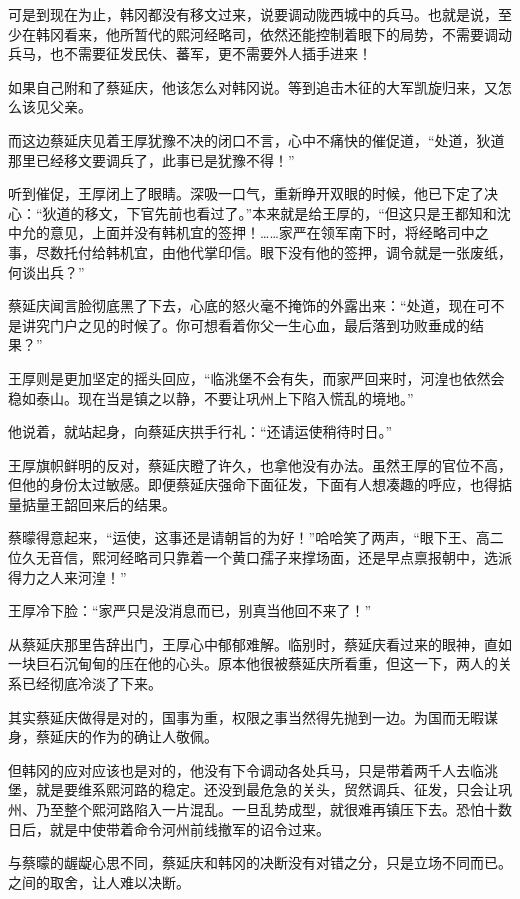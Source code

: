 可是到现在为止，韩冈都没有移文过来，说要调动陇西城中的兵马。也就是说，至少在韩冈看来，他所暂代的熙河经略司，依然还能控制着眼下的局势，不需要调动兵马，也不需要征发民伕、蕃军，更不需要外人插手进来！

如果自己附和了蔡延庆，他该怎么对韩冈说。等到追击木征的大军凯旋归来，又怎么该见父亲。

而这边蔡延庆见着王厚犹豫不决的闭口不言，心中不痛快的催促道，“处道，狄道那里已经移文要调兵了，此事已是犹豫不得！”

听到催促，王厚闭上了眼睛。深吸一口气，重新睁开双眼的时候，他已下定了决心：“狄道的移文，下官先前也看过了。”本来就是给王厚的，“但这只是王都知和沈中允的意见，上面并没有韩机宜的签押！……家严在领军南下时，将经略司中之事，尽数托付给韩机宜，由他代掌印信。眼下没有他的签押，调令就是一张废纸，何谈出兵？”

蔡延庆闻言脸彻底黑了下去，心底的怒火毫不掩饰的外露出来：“处道，现在可不是讲究门户之见的时候了。你可想看着你父一生心血，最后落到功败垂成的结果？”

王厚则是更加坚定的摇头回应，“临洮堡不会有失，而家严回来时，河湟也依然会稳如泰山。现在当是镇之以静，不要让巩州上下陷入慌乱的境地。”

他说着，就站起身，向蔡延庆拱手行礼：“还请运使稍待时日。”

王厚旗帜鲜明的反对，蔡延庆瞪了许久，也拿他没有办法。虽然王厚的官位不高，但他的身份太过敏感。即便蔡延庆强命下面征发，下面有人想凑趣的呼应，也得掂量掂量王韶回来后的结果。

蔡曚得意起来，“运使，这事还是请朝旨的为好！”哈哈笑了两声，“眼下王、高二位久无音信，熙河经略司只靠着一个黄口孺子来撑场面，还是早点禀报朝中，选派得力之人来河湟！”

王厚冷下脸：“家严只是没消息而已，别真当他回不来了！”

从蔡延庆那里告辞出门，王厚心中郁郁难解。临别时，蔡延庆看过来的眼神，直如一块巨石沉甸甸的压在他的心头。原本他很被蔡延庆所看重，但这一下，两人的关系已经彻底冷淡了下来。

其实蔡延庆做得是对的，国事为重，权限之事当然得先抛到一边。为国而无暇谋身，蔡延庆的作为的确让人敬佩。

但韩冈的应对应该也是对的，他没有下令调动各处兵马，只是带着两千人去临洮堡，就是要维系熙河路的稳定。还没到最危急的关头，贸然调兵、征发，只会让巩州、乃至整个熙河路陷入一片混乱。一旦乱势成型，就很难再镇压下去。恐怕十数日后，就是中使带着命令河州前线撤军的诏令过来。

与蔡曚的龌龊心思不同，蔡延庆和韩冈的决断没有对错之分，只是立场不同而已。之间的取舍，让人难以决断。

